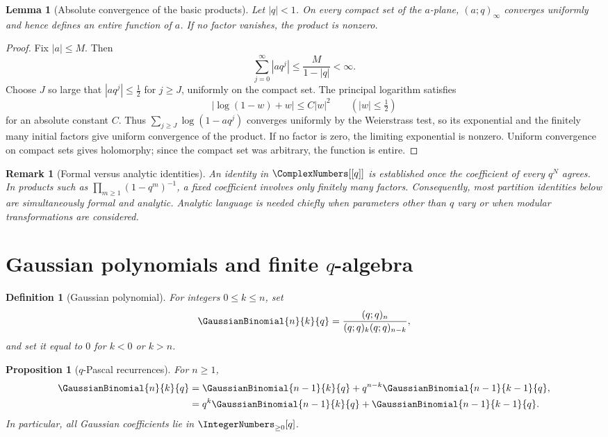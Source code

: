 \documentclass[11pt]{article}
\theoremstyle{blueplain}
\newtheorem{proposition}[theorem]{Proposition}
\newtheorem{lemma}[theorem]{Lemma}
\theoremstyle{bluedef}
\newtheorem{definition}[theorem]{Definition}
\newtheorem{remark}[theorem]{Remark}
\begin{document}
\begin{lemma}[Absolute convergence of the basic products]\label{lem:product-convergence}
Let $|q|<1$. On every compact set of the $a$-plane, $(a;q)_\infty$ converges uniformly and hence defines an entire function of $a$. If no factor vanishes, the product is nonzero.
\end{lemma}

\begin{proof}
Fix $|a|\le M$. Then
\[
\sum_{j=0}^{\infty}|aq^j|\le \frac{M}{1-|q|}<\infty.
\]
Choose $J$ so large that $|aq^j|\le \tfrac12$ for $j\ge J$, uniformly on the compact set. The principal logarithm satisfies
\[
|\log(1-w)+w|\le C|w|^2\qquad(|w|\le\tfrac12)
\]
for an absolute constant $C$. Thus $\sum_{j\ge J}\log(1-aq^j)$ converges uniformly by the Weierstrass test, so its exponential and the finitely many initial factors give uniform convergence of the product. If no factor is zero, the limiting exponential is nonzero. Uniform convergence on compact sets gives holomorphy; since the compact set was arbitrary, the function is entire.
\end{proof}

\begin{remark}[Formal versus analytic identities]
An identity in $\ComplexNumbers[[q]]$ is established once the coefficient of every $q^N$ agrees. In products such as $\prod_{m\ge1}(1-q^m)^{-1}$, a fixed coefficient involves only finitely many factors. Consequently, most partition identities below are simultaneously formal and analytic. Analytic language is needed chiefly when parameters other than $q$ vary or when modular transformations are considered.
\end{remark}

\section{Gaussian polynomials and finite $q$-algebra}

\begin{definition}[Gaussian polynomial]
For integers $0\le k\le n$, set
\[
\GaussianBinomial{n}{k}{q}=\frac{(q;q)_n}{(q;q)_k(q;q)_{n-k}},
\]
and set it equal to $0$ for $k<0$ or $k>n$.
\end{definition}

\begin{proposition}[$q$-Pascal recurrences]\label{prop:q-pascal}
For $n\ge1$,
\begin{align}
\GaussianBinomial{n}{k}{q}
 &=\GaussianBinomial{n-1}{k}{q}+q^{n-k}\GaussianBinomial{n-1}{k-1}{q}, \label{eq:qpascal1}\\
 &=q^k\GaussianBinomial{n-1}{k}{q}+\GaussianBinomial{n-1}{k-1}{q}. \label{eq:qpascal2}
\end{align}
In particular, all Gaussian coefficients lie in $\IntegerNumbers_{\ge0}[q]$.
\end{proposition}
\end{document}
